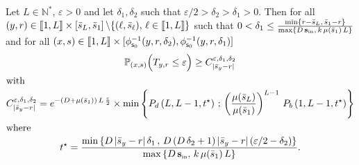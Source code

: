 \documentclass[AHL,Unicode,longabstracts,published]{cedram}
\newcommand{\llbracket}{\mathopen{[\mkern -2.7mu[}}
\newcommand{\rrbracket}{\mathclose{]\mkern -2.7mu]}}
\newcommand{\PP}{\mathbb{P}}
\newcommand{\NN}{\mathbb{N}}
\newcommand{\Sin}{{\mathbf s}_{\textrm{\tiny\rm in}}}
\newcommand{\barmu}{\mu(\bar s_1)}
\newcommand{\ens}[2]{\left[#1,#2\right]}
\newcommand{\phis}{\phi_{\textsf{s}_0}^{-1}}
\newcommand{\setunL}{\llbracket 1, L\rrbracket}
\newcommand{\1}{\mathbf{1}}
\begin{document}
\begin{lemm}\label{reach.y_s_general}
Let $L\in \NN^*$, $\varepsilon>0$ and let $\delta_1, \delta_2$ such that $\varepsilon/2>\delta_2>\delta_1>0$. Then for all $(y,r)\in \setunL \times \ens{\bar s_L}{\bar s_1} \backslash \{(\ell,\bar s_\ell),\, \ell\in \setunL\}$ such that $0<\delta_1\leq \frac{\min\{r-\bar s_{L},\, \bar s_1-r\}}{\max\{D\,\Sin,\, k\,\barmu\,L\}}$ and for all $(x,s) \in \setunL \times [\phis(y,r,\delta_2), \phis(y,r,\delta_1)]$
\begin{gather*}
\PP_{(x,s)}
\Big(T_{y,r} \leq \varepsilon \Big)\geq C^{\varepsilon, \delta_1, \delta_2}_{\left|\bar s_y -r\right|}
\\
\intertext{with}
C^{\varepsilon, \delta_1, \delta_2}_{\left|\bar s_y -r\right|} = e^{-(D+\barmu)\,L\,\frac{\varepsilon}{2}}
\times
\min\left\{P_d\left(L,L-1, t^\star\right) \, ; \,
\left(\frac{\mu(\bar s_L)}{\barmu}\right)^{L-1}\,P_b\left(1,L-1, t^\star\right)\right\}
\\
\intertext{where}
t^\star =
\frac{\min \left\{D\,|\bar s_y-r|\,\delta_1 \,, \, D\,(D\,\delta_2+1)\,|\bar s_y-r|\,(\varepsilon/2-\delta_2)\right\}} {\max\left\{D\,\Sin,\,k\,\barmu\,L\right\}}.
\end{gather*}
\end{lemm}
\end{document}
